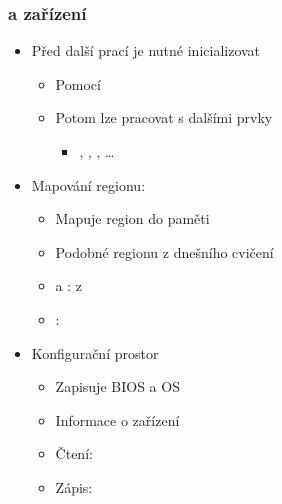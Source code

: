 \begin{frame}
  \frametitle{ a zařízení}

  \begin{itemize}
    \item Před další prací je nutné inicializovat 
    \begin{itemize}
      \item Pomocí 
      \item Potom lze pracovat s dalšími prvky 
      \begin{itemize}
        \item {}, , , \dots
      \end{itemize}
    \end{itemize}

    \pause
    \medskip

  \item Mapování regionu: 
    \begin{itemize}
      \item Mapuje region do paměti
      \item Podobné  regionu z dnešního cvičení
      \item {} a : z 
      \item {}: 
    \end{itemize}

    \pause
    \medskip

    \item Konfigurační prostor
    \begin{itemize}
      \item Zapisuje BIOS a OS
      \item Informace o zařízení
      \item Čtení: 
      \item Zápis: 
    \end{itemize}
  \end{itemize}

\end{frame}

